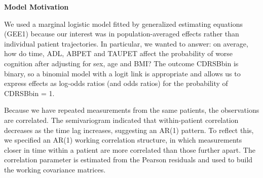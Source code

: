 \documentclass[
  11pt,
  letterpaper,
  DIV=11,
  numbers=noendperiod]{scrartcl}
\begin{document}
\begin{table}
\caption{GEE Model Results (Odds Ratios)}\tabularnewline

\centering\begingroup\fontsize{9}{11}\selectfont

\endgroup{}
\end{table}

\textbf{Model Motivation}

We used a marginal logistic model fitted by generalized estimating
equations (GEE1) because our interest was in population-averaged effects
rather than individual patient trajectories. In particular, we wanted to
answer: on average, how do time, ADL, ABPET and TAUPET affect the
probability of worse cognition after adjusting for sex, age and BMI? The
outcome CDRSBbin is binary, so a binomial model with a logit link is
appropriate and allows us to express effects as log-odds ratios (and
odds ratios) for the probability of CDRSBbin = 1.

Because we have repeated measurements from the same patients, the
observations are correlated. The semivariogram indicated that
within-patient correlation decreases as the time lag increases,
suggesting an AR(1) pattern. To reflect this, we specified an AR(1)
working correlation structure, in which measurements closer in time
within a patient are more correlated than those further apart. The
correlation parameter is estimated from the Pearson residuals and used
to build the working covariance matrices.
\end{document}
